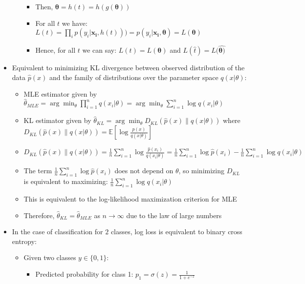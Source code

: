 \begin{itemize}
\begin{itemize}
\begin{itemize}
            \item Then, $\boldsymbol{\theta} = h(t) = h(g(\boldsymbol{\theta}))$
            \item For all $t$ we have: $L(t) = \prod_i p(y_i |\boldsymbol{x_i}, h(t))) = p(y_i |\boldsymbol{x_i}, \boldsymbol{\theta}) = L(\boldsymbol{\theta})$
            \item Hence, for all $t$ we can say: $L(t) = L(\boldsymbol{\theta})$ and $L(\hat{t}) = L(\hat{\boldsymbol{\theta})}$
        \end{itemize}
    \end{itemize}
    \item Equivalent to minimizing KL divergence between observed distribution of the data $\hat{p}(x)$ and the family of distributions over the parameter space $q(x|\theta)$:
    \begin{itemize}
        \item MLE estimator given by $\hat{\theta}_{MLE} = \arg\min_{\theta} \prod_{i=1}^n q(x_i|\theta) = \arg\min_{\theta}\sum_{i=1}^n \log q(x_i|\theta)$
        \item KL estimator given by $\hat{\theta}_{KL} = \arg\min_{\theta} D_{KL}(\hat{p}(x) \| q(x|\theta))$ where
        $D_{KL}(\hat{p}(x) \| q(x|\theta)) = \mathbb{E} \left[ \log \frac{\hat{p}(x)}{q(x|\theta)} \right]$
        \item $D_{KL}(\hat{p}(x) \| q(x|\theta)) = \frac{1}{n} \sum_{i=1}^n \log \frac{\hat{p}(x_i)}{q(x_i|\theta)} = \frac{1}{n} \sum_{i=1}^n \log \hat{p}(x_i) - \frac{1}{n} \sum_{i=1}^n \log q(x_i|\theta)$
        \item The term $\frac{1}{n} \sum_{i=1}^n \log \hat{p}(x_i)$ does not depend on $\theta$, so minimizing $D_{KL}$ is equivalent to maximizing:
        $\frac{1}{n} \sum_{i=1}^n \log q(x_i|\theta)$
        \item This is equivalent to the log-likelihood maximization criterion for MLE
        \item Therefore, $\hat{\theta}_{KL} = \hat{\theta}_{MLE}$ as $n \to \infty$ due to the law of large numbers
    \end{itemize}
    \item In the case of classification for $2$ classes, log loss is equivalent to binary cross entropy:
    \begin{itemize}
        \item Given two classes $y \in \{0, 1\}$:
            \begin{itemize}
                \item Predicted probability for class 1: $p_1 = \sigma(z) = \frac{1}{1 + e^{-z}}$

\end{itemize}
\end{itemize}
\end{itemize}
